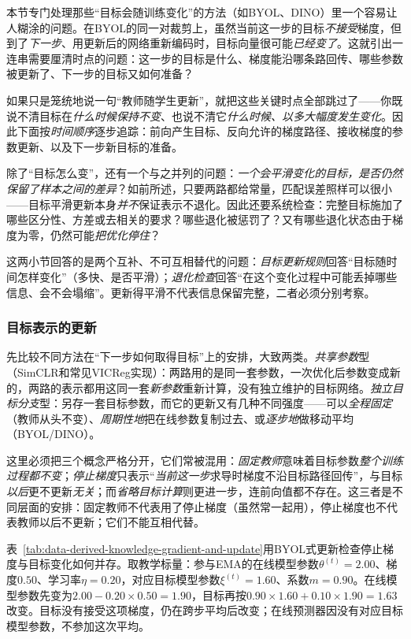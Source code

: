 本节专门处理那些“目标会随训练变化”的方法（如BYOL、DINO）里一个容易让人糊涂的问题。在BYOL的同一对裁剪上，虽然当前这一步的目标\emph{不接受}梯度，但到了\emph{下一步}、用更新后的网络重新编码时，目标向量很可能\emph{已经变了}。这就引出一连串需要厘清时点的问题：这一步的目标是什么、梯度能沿哪条路回传、哪些参数被更新了、下一步的目标又如何准备？

如果只是笼统地说一句“教师随学生更新”，就把这些关键时点全部跳过了——你既说不清目标在\emph{什么时候保持不变}、也说不清它\emph{什么时候、以多大幅度发生变化}。因此下面按\emph{时间顺序}逐步追踪：前向产生目标、反向允许的梯度路径、接收梯度的参数更新、以及下一步新目标的准备。

除了“目标怎么变”，还有一个与之并列的问题：\emph{一个会平滑变化的目标，是否仍然保留了样本之间的差异}？如前所述，只要两路都给常量，匹配误差照样可以很小——目标平滑更新本身\emph{并不}保证表示不退化。因此还要系统检查：完整目标施加了哪些区分性、方差或去相关的要求？哪些退化被惩罚了？又有哪些退化状态由于梯度为零，仍然可能\emph{把优化停住}？

这两小节回答的是两个互补、不可互相替代的问题：\emph{目标更新规则}回答“目标随时间怎样变化”（多快、是否平滑）；\emph{退化检查}回答“在这个变化过程中可能丢掉哪些信息、会不会塌缩”。更新得平滑不代表信息保留完整，二者必须分别考察。

\subsubsection{目标表示的更新}
\label{sec:data-derived-knowledge-target-representation-update}

先比较不同方法在“下一步如何取得目标”上的安排，大致两类。\emph{共享参数}型（SimCLR和常见VICReg实现）：两路用的是同一套参数，一次优化后参数变成新的，两路的表示都用这同一套\emph{新参数}重新计算，没有独立维护的目标网络。\emph{独立目标分支}型：另存一套目标参数，而它的更新又有几种不同强度——可以\emph{全程固定}（教师从头不变）、\emph{周期性地}把在线参数复制过去、或\emph{逐步地}做移动平均（BYOL/DINO）。

这里必须把三个概念严格分开，它们常被混用：\emph{固定教师}意味着目标参数\emph{整个训练过程都不变}；\emph{停止梯度}只表示“\emph{当前这一步}求导时梯度不沿目标路径回传”，与目标\emph{以后}更不更新\emph{无关}；而\emph{省略目标计算}则更进一步，连前向值都不存在。这三者是不同层面的安排：固定教师不代表用了停止梯度（虽然常一起用），停止梯度也不代表教师以后不更新；它们不能互相代替。

表~\ref{tab:data-derived-knowledge-gradient-and-update}用BYOL式更新检查停止梯度与目标变化如何并存。取教学标量：参与EMA的在线模型参数$\theta^{(t)}=2.00$、梯度$0.50$、学习率$\eta=0.20$，对应目标模型参数$\xi^{(t)}=1.60$、系数$m=0.90$。在线模型参数先变为$2.00-0.20\times0.50=1.90$，目标再按$0.90\times1.60+0.10\times1.90=1.63$改变。目标没有接受这项梯度，仍在跨步平均后改变；在线预测器因没有对应目标模型参数，不参加这次平均。


